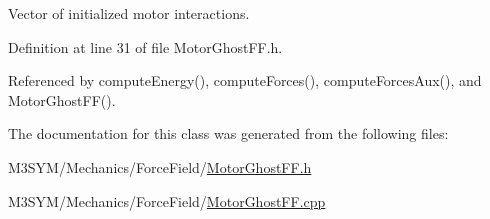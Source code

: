 Vector of initialized motor interactions. 



Definition at line 31 of file Motor\+Ghost\+F\+F.\+h.



Referenced by compute\+Energy(), compute\+Forces(), compute\+Forces\+Aux(), and Motor\+Ghost\+F\+F().



The documentation for this class was generated from the following files\+:\begin{DoxyCompactItemize}
\item 
M3\+S\+Y\+M/\+Mechanics/\+Force\+Field/\hyperlink{MotorGhostFF_8h}{Motor\+Ghost\+F\+F.\+h}\item 
M3\+S\+Y\+M/\+Mechanics/\+Force\+Field/\hyperlink{MotorGhostFF_8cpp}{Motor\+Ghost\+F\+F.\+cpp}\end{DoxyCompactItemize}
